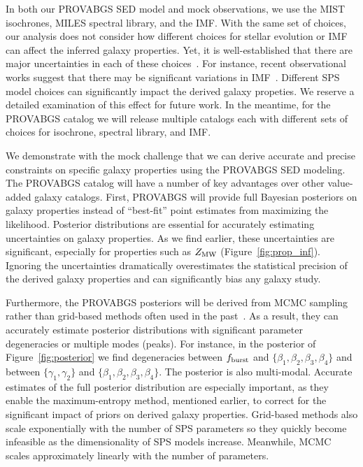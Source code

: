 In both our {\sc PROVABGS} SED model and mock observations, we use the MIST
isochrones, MILES spectral library, and the \cite{chabrier2003} IMF.
With the same set of choices, our analysis does not consider how different
choices for stellar evolution or IMF can affect the inferred galaxy properties. 
Yet, it is well-established that there are major uncertainties in each of these
choices~\citep{conroy2009, conroy2013}.
For instance, recent observational works suggest that there may be significant
variations in IMF~\citep[\emph{e.g.}][]{treu2010, vandokkum2010, rosani2018,
sonnenfeld2019}. 
Different SPS model choices can significantly impact the derived galaxy
propeties.
We reserve a detailed examination of this effect for future work. 
In the meantime, for the {\sc PROVABGS} catalog we will release multiple
catalogs each with different sets of choices for isochrone, spectral library,
and IMF.

We demonstrate with the mock challenge that we can derive accurate and precise
constraints on specific galaxy properties using the {\sc PROVABGS} SED modeling.
The {\sc PROVABGS} catalog will have a number of key advantages over other
value-added galaxy catalogs. 
First, {\sc PROVABGS} will provide full Bayesian posteriors on galaxy
properties instead of ``best-fit'' point estimates from maximizing the
likelihood. 
Posterior distributions are essential for accurately estimating uncertainties
on galaxy properties.  
As we find earlier, these uncertainties are significant, especially for
properties such as $Z_{\rm MW}$ (Figure~\ref{fig:prop_inf}). 
Ignoring the uncertainties dramatically overestimates the statistical precision
of the derived galaxy properties and can significantly bias any galaxy study.

Furthermore, the {\sc PROVABGS} posteriors will be derived from MCMC sampling
rather than grid-based methods often used in the
past~\citep[\emph{e.g.}][]{dacunha2008, moustakas2013, boquien2019}.
As a result, they can accurately estimate posterior distributions with
significant parameter degeneracies or multiple modes (peaks). 
For instance, in the posterior of Figure~\ref{fig:posterior} we find
degeneracies between $f_{\rm burst}$ and $\{\beta_1, \beta_2, \beta_3,
\beta_4\}$ and between $\{\gamma_1, \gamma_2\}$ and $\{\beta_1, \beta_2,
\beta_3, \beta_4\}$. 
The posterior is also multi-modal. 
Accurate estimates of the full posterior distribution are especially important,
as they enable the maximum-entropy method, mentioned earlier, 
to correct for the significant impact of priors on derived galaxy properties.
Grid-based methods also scale exponentially with the number of SPS parameters
so they quickly become infeasible as the dimensionality of SPS models increase. 
Meanwhile, MCMC scales approximately linearly with the number of parameters. 

